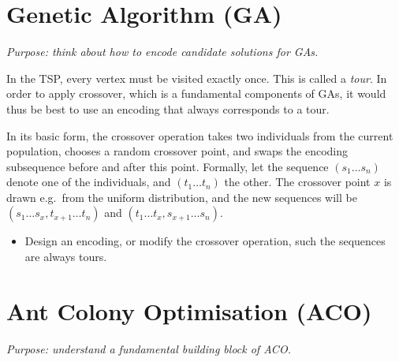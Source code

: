 \documentclass[a4paper]{article}
\begin{document}
%
%



\section*{Genetic Algorithm (GA)}

\emph{Purpose: think about how to encode candidate solutions for GAs.}

\noindent
In the TSP, every vertex must be visited exactly once.
This is called a \emph{tour}.
In order to apply crossover, which is a fundamental components of GAs, it would thus be best to use an encoding that always corresponds to a tour.

In its basic form, the crossover operation takes two individuals from the current population, chooses a random crossover point, and swaps the encoding subsequence before and after this point.
Formally, let the sequence $(s_1 \ldots s_n)$ denote one of the individuals, and $(t_1 \ldots t_n)$ the other.
The crossover point $x$ is drawn e.g.\ from the uniform distribution, and the new sequences will be $(s_1 \ldots s_x, t_{x+1} \ldots t_n)$ and $(t_1 \ldots t_x, s_{x+1} \ldots s_n)$.

\begin{itemize}
\item
  Design an encoding, or modify the crossover operation, such the sequences are always tours.
\end{itemize}



\section*{Ant Colony Optimisation (ACO)}

\emph{Purpose: understand a fundamental building block of ACO.}
\end{document}
